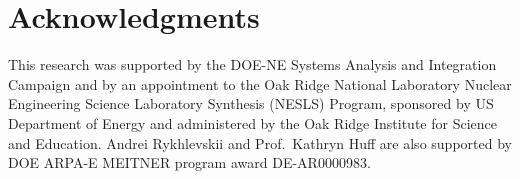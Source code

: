 \documentclass[letterpaper]{mandc2019}
\begin{document}
\section{Acknowledgments}
This research was supported by the DOE-NE Systems Analysis and Integration Campaign and by an appointment to the Oak Ridge National Laboratory Nuclear Engineering Science Laboratory Synthesis (NESLS) Program, sponsored by US Department of Energy and administered by the Oak Ridge Institute for Science and Education. 
Andrei Rykhlevskii and Prof.\ Kathryn Huff are also supported by DOE ARPA-E MEITNER program award DE-AR0000983.
\setlength{\baselineskip}{12pt}
\setlength{\bibsep}{4pt}


\end{document}
